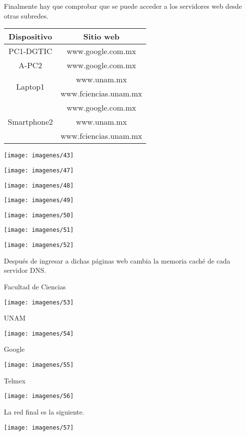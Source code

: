 \documentclass{article}
\begin{document}
Finalmente hay que comprobar que se puede acceder a los servidores web desde otras subredes.

\begin{center}
\begin{tabular}{|c|c|}
\hline
\textbf{Dispositivo} & \textbf{Sitio web} \\ \hline
PC1-DGTIC & www.google.com.mx \\ \hline
A-PC2 & www.google.com.mx \\ \hline
\multirow{2}{*}{Laptop1} & www.unam.mx \\
& www.fciencias.unam.mx\\ \hline
\multirow{3}{*}{Smartphone2} & www.google.com.mx \\
& www.unam.mx \\
& www.fciencias.unam.mx \\ \hline
\end{tabular}
\end{center}

\begin{center}
\texttt{[image: imagenes/43]}

\texttt{[image: imagenes/47]}

\texttt{[image: imagenes/48]}

\texttt{[image: imagenes/49]}

\texttt{[image: imagenes/50]}

\texttt{[image: imagenes/51]}

\texttt{[image: imagenes/52]}
\end{center}

Después de ingresar a dichas páginas web cambia la memoria caché de cada servidor DNS.

\begin{center}
Facultad de Ciencias

\texttt{[image: imagenes/53]}

UNAM

\texttt{[image: imagenes/54]}

Google

\texttt{[image: imagenes/55]}

Telmex

\texttt{[image: imagenes/56]}
\end{center}

La red final es la siguiente.

\begin{center}
\texttt{[image: imagenes/57]}
\end{center}
\end{document}

